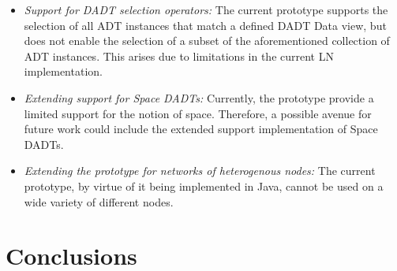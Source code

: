 \begin{itemize}
  \item \emph{Support for DADT selection operators:} The current prototype
  supports the selection of all ADT instances that match a defined DADT Data
  view, but does not enable the selection of a subset of the aforementioned
  collection of ADT instances. This arises due to limitations in the current LN implementation.
  \item \emph{Extending support for Space DADTs:} Currently, the prototype
  provide a limited support for the notion of space. Therefore, a
  possible avenue for future work could include the extended support implementation of Space DADTs.
  \item \emph{Extending the prototype for networks of heterogenous nodes:}
  The current prototype, by virtue of it being implemented in Java, cannot be
  used on a wide variety of different nodes. 
\end{itemize}

\section{Conclusions}

